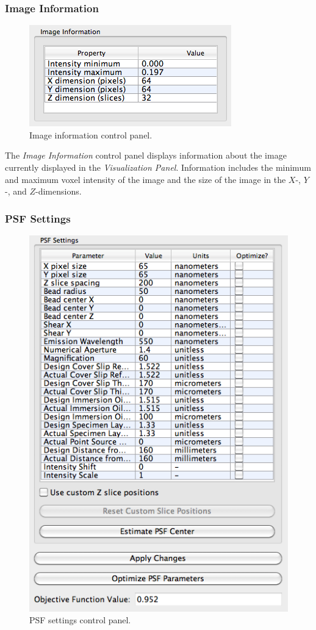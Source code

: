 \documentclass[11pt,titlepage,twoside]{article}
\begin{document}
\subsubsection{Image Information}

  \begin{figure}[h]
    \centering
    \includegraphics[scale=0.5]{images/ImageInformationControlPanel}
    \caption{Image information control panel.}
    \label{fig:ImageInformationControlPanel}
  \end{figure}


The \emph{Image Information} control panel displays information about the image currently displayed in the \emph{Visualization Panel}. Information includes the minimum and maximum voxel intensity of the image and the size of the image in the $X$-, $Y$-, and $Z$-dimensions.

\subsubsection{PSF Settings}

\begin{figure}[h]
  \centering
  \includegraphics[scale=0.5]{images/PSFSettingsControlPanel}
  \caption{PSF settings control panel.}
  \label{fig:PSFSettingsControlPanel}
\end{figure}
\end{document}
